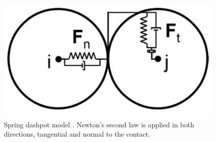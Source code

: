 \begin{figure}[!htb]
\centering
\includegraphics[width=.40\columnwidth]{images/128springdashpot}
\caption[Spring dashpot]{Spring dashpot model \cite{RefWorks:201}. Newton's
second law is applied in both directions, tangential and normal to the contact.}
\label{fig:128springdashpot}
\end{figure}